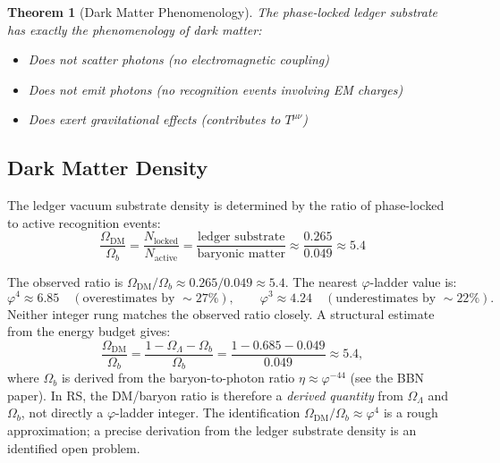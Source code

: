 \documentclass[12pt,a4paper]{article}
\newtheorem{theorem}{Theorem}[section]
\theoremstyle{definition}
\theoremstyle{remark}
\begin{document}
\begin{theorem}[Dark Matter Phenomenology]\label{thm:dm-pheno}
The phase-locked ledger substrate has exactly the phenomenology of dark matter:
\begin{itemize}
\item Does not scatter photons (no electromagnetic coupling)
\item Does not emit photons (no recognition events involving EM charges)
\item Does exert gravitational effects (contributes to $T^{\mu\nu}$)
\end{itemize}
\end{theorem}

\subsection{Dark Matter Density}

The ledger vacuum substrate density is determined by the ratio of phase-locked to 
active recognition events:
\begin{equation}
\frac{\Omega_\mathrm{DM}}{\Omega_b} = \frac{N_\mathrm{locked}}{N_\mathrm{active}} 
= \frac{\text{ledger substrate}}{\text{baryonic matter}} \approx \frac{0.265}{0.049} \approx 5.4
\end{equation}

The observed ratio is $\Omega_{\mathrm{DM}}/\Omega_b \approx 0.265/0.049
\approx 5.4$.  The nearest $\varphi$-ladder value is:
\begin{equation}
\varphi^4 \approx 6.85 \quad (\text{overestimates by }{\sim}27\%),
\qquad
\varphi^3 \approx 4.24 \quad (\text{underestimates by }{\sim}22\%).
\end{equation}
Neither integer rung matches the observed ratio closely.  A
structural estimate from the energy budget gives:
\begin{equation}
\frac{\Omega_{\mathrm{DM}}}{\Omega_b}
= \frac{1 - \Omega_\Lambda - \Omega_b}{\Omega_b}
= \frac{1 - 0.685 - 0.049}{0.049} \approx 5.4,
\end{equation}
where $\Omega_b$ is derived from the baryon-to-photon ratio
$\eta \approx \varphi^{-44}$ (see the BBN paper).  In RS, the
DM/baryon ratio is therefore a \emph{derived quantity} from
$\Omega_\Lambda$ and $\Omega_b$, not directly a $\varphi$-ladder
integer.  The identification $\Omega_{\mathrm{DM}}/\Omega_b \approx
\varphi^4$ is a rough approximation; a precise derivation from the
ledger substrate density is an identified open problem.
\end{document}
